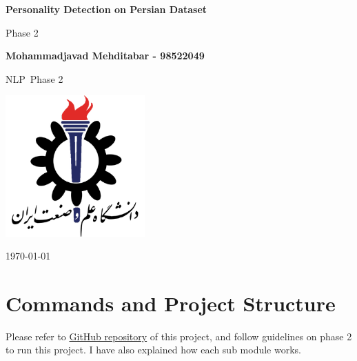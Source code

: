 \documentclass[10pt, a4paper]{article}
\newcommand\course{NLP}                            %
\newcommand\hwnumber{2}                                 %
\newcommand\Information{Mohammadjavad Mehditabar - 98522049}                        %
\begin{document}
\begin{titlepage}
    \begin{center}
        \vspace*{3cm}

        \Huge
        \textbf{Personality Detection on Persian Dataset}

        \vspace{1cm}
        \huge
        Phase \hwnumber

        \vspace{1.5cm}
        \Large

        \textbf{\Information}                      %


        \vfill

        \course \ Phase \hwnumber

        \vspace{1cm}

        \includegraphics[width=0.4\textwidth]{images/iust-logo.png}
        \\

        \Large

        \today

    \end{center}
\end{titlepage}

\newpage

\vspace*{0.1cm}

\tableofcontents
\newpage
\section{Commands and Project Structure}
Please refer to \href{https://github.com/mjavadmt/PersonalityDetection}{GitHub repository} of this project, and follow guidelines on phase 2 to run this project. I have also explained
how each sub module works.
\end{document}
